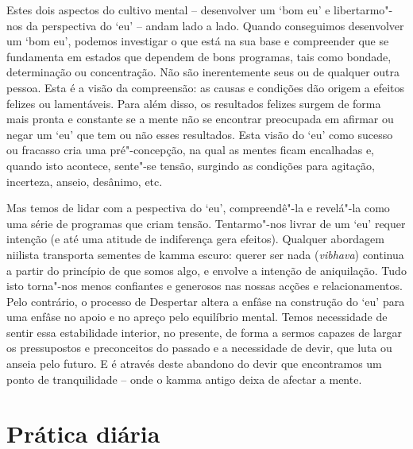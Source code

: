\enlargethispage{2\baselineskip}

Estes dois aspectos do cultivo mental -- desenvolver um `bom eu' e
libertarmo"-nos da perspectiva do `eu' -- andam lado a lado. Quando conseguimos
desenvolver um `bom eu', podemos investigar o que está na sua base e compreender
que se fundamenta em estados que dependem de bons programas, tais como bondade,
determinação ou concentração. Não são inerentemente seus ou de qualquer outra
pessoa. Esta é a visão da compreensão: as causas e condições dão origem a
efeitos felizes ou lamentáveis. Para além disso, os resultados felizes surgem de
forma mais pronta e constante se a mente não se encontrar preocupada em afirmar
ou negar um `eu' que tem ou não esses resultados. Esta visão do `eu' como
sucesso ou fracasso cria uma pré"-concepção, na qual as mentes ficam encalhadas
e, quando isto acontece, sente"-se tensão, surgindo as condições para agitação,
incerteza, anseio, desânimo, etc.

Mas temos de lidar com a pespectiva do `eu', compreendê"-la e revelá"-la como uma
série de programas que criam tensão. Tentarmo"-nos livrar de um `eu' requer
intenção (e até uma atitude de indiferença gera efeitos). Qualquer abordagem
niilista transporta sementes de kamma escuro: querer ser nada (\emph{vibhava})
continua a partir do princípio de que somos algo, e envolve a intenção de
aniquilação. Tudo isto torna"-nos menos confiantes e generosos nas nossas acções
e relacionamentos. Pelo contrário, o processo de Despertar altera a enfâse na
construção do `eu' para uma enfâse no apoio e no apreço pelo equilíbrio mental.
Temos necessidade de sentir essa estabilidade interior, no presente, de forma a
sermos capazes de largar os pressupostos e preconceitos do passado e a
necessidade de devir, que luta ou anseia pelo futuro. E é através deste abandono
do devir que encontramos um ponto de tranquilidade -- onde o kamma antigo deixa
de afectar a mente.

\section{Prática diária}

